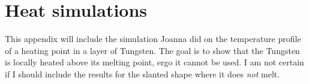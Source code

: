 \chapter{Heat simulations}
\label{sec:heatsims}
This appendix will include the simulation Joanna did on the temperature profile of a heating point in a layer of Tungsten. The goal is to show that the Tungsten is locally heated above its melting point, ergo it cannot be used. I am not certain if I should include the results for the slanted shape where it does \textit{not} melt.